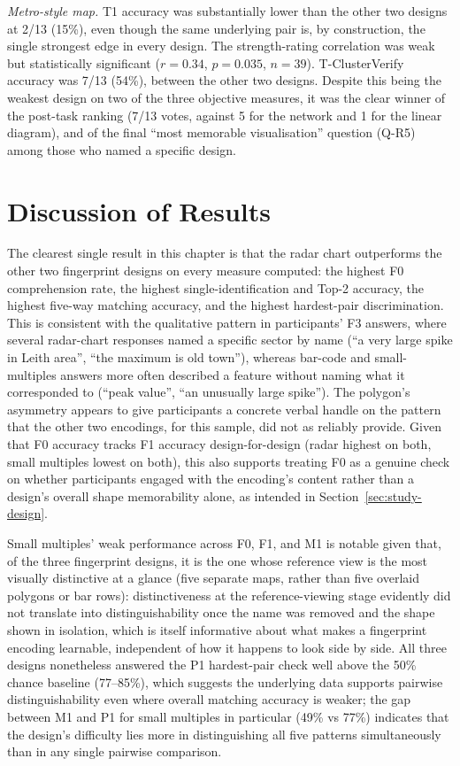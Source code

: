 \documentclass[logo,msc]{infthesis}
\begin{document}
\emph{Metro-style map.} T1 accuracy was substantially lower than the other two designs at 2/13 (15\%), even though the same underlying pair is, by construction, the single strongest edge in every design. The strength-rating correlation was weak but statistically significant ($r=0.34$, $p=0.035$, $n=39$). T-ClusterVerify accuracy was 7/13 (54\%), between the other two designs. Despite this being the weakest design on two of the three objective measures, it was the clear winner of the post-task ranking (7/13 votes, against 5 for the network and 1 for the linear diagram), and of the final ``most memorable visualisation'' question (Q-R5) among those who named a specific design.

\section{Discussion of Results}

The clearest single result in this chapter is that the radar chart outperforms the other two fingerprint designs on every measure computed: the highest F0 comprehension rate, the highest single-identification and Top-2 accuracy, the highest five-way matching accuracy, and the highest hardest-pair discrimination. This is consistent with the qualitative pattern in participants' F3 answers, where several radar-chart responses named a specific sector by name (``a very large spike in Leith area'', ``the maximum is old town''), whereas bar-code and small-multiples answers more often described a feature without naming what it corresponded to (``peak value'', ``an unusually large spike''). The polygon's asymmetry appears to give participants a concrete verbal handle on the pattern that the other two encodings, for this sample, did not as reliably provide. Given that F0 accuracy tracks F1 accuracy design-for-design (radar highest on both, small multiples lowest on both), this also supports treating F0 as a genuine check on whether participants engaged with the encoding's content rather than a design's overall shape memorability alone, as intended in Section~\ref{sec:study-design}.

Small multiples' weak performance across F0, F1, and M1 is notable given that, of the three fingerprint designs, it is the one whose reference view is the most visually distinctive at a glance (five separate maps, rather than five overlaid polygons or bar rows): distinctiveness at the reference-viewing stage evidently did not translate into distinguishability once the name was removed and the shape shown in isolation, which is itself informative about what makes a fingerprint encoding learnable, independent of how it happens to look side by side. All three designs nonetheless answered the P1 hardest-pair check well above the 50\% chance baseline (77--85\%), which suggests the underlying data supports pairwise distinguishability even where overall matching accuracy is weaker; the gap between M1 and P1 for small multiples in particular (49\% vs 77\%) indicates that the design's difficulty lies more in distinguishing all five patterns simultaneously than in any single pairwise comparison.
\end{document}
